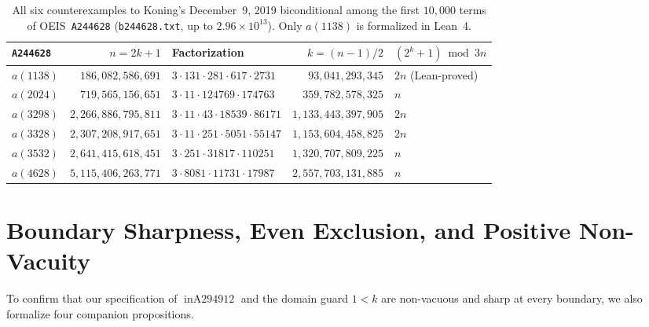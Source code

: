 \documentclass[11pt]{article}
\theoremstyle{definition}
\newcommand{\seq}[1]{\texttt{#1}}
\newcommand{\inA}{\operatorname{inA294912}}
\begin{document}
\begin{table}[ht]
\centering
\caption{All six counterexamples to Koning's December~9, 2019 biconditional among the first $10{,}000$ terms of OEIS~\seq{A244628} (\texttt{b244628.txt}, up to $2.96 \times 10^{13}$). Only $a(1138)$ is formalized in Lean~4.}
\label{tab:six-witnesses}
\smallskip
{\small
\begin{tabular}{@{}l r l r l@{}}
\toprule
\seq{A244628} & $n = 2k + 1$ & Factorization & $k = (n-1)/2$ & $(2^k+1) \bmod 3n$ \\
\midrule
$a(1138)$ & $186{,}082{,}586{,}691$ & $3 \cdot 131 \cdot 281 \cdot 617 \cdot 2731$ & $93{,}041{,}293{,}345$ & $2n$ (Lean-proved) \\
$a(2024)$ & $719{,}565{,}156{,}651$ & $3 \cdot 11 \cdot 124769 \cdot 174763$ & $359{,}782{,}578{,}325$ & $n$ \\
$a(3298)$ & $2{,}266{,}886{,}795{,}811$ & $3 \cdot 11 \cdot 43 \cdot 18539 \cdot 86171$ & $1{,}133{,}443{,}397{,}905$ & $2n$ \\
$a(3328)$ & $2{,}307{,}208{,}917{,}651$ & $3 \cdot 11 \cdot 251 \cdot 5051 \cdot 55147$ & $1{,}153{,}604{,}458{,}825$ & $2n$ \\
$a(3532)$ & $2{,}641{,}415{,}618{,}451$ & $3 \cdot 251 \cdot 31817 \cdot 110251$ & $1{,}320{,}707{,}809{,}225$ & $n$ \\
$a(4628)$ & $5{,}115{,}406{,}263{,}771$ & $3 \cdot 8081 \cdot 11731 \cdot 17987$ & $2{,}557{,}703{,}131{,}885$ & $n$ \\
\bottomrule
\end{tabular}
}
\end{table}

\section{Boundary Sharpness, Even Exclusion, and Positive Non-Vacuity}
\label{sec:boundaries}

To confirm that our specification of $\inA$ and the domain guard $1 < k$ are non-vacuous and sharp at every boundary, we also formalize four companion propositions.
\end{document}
